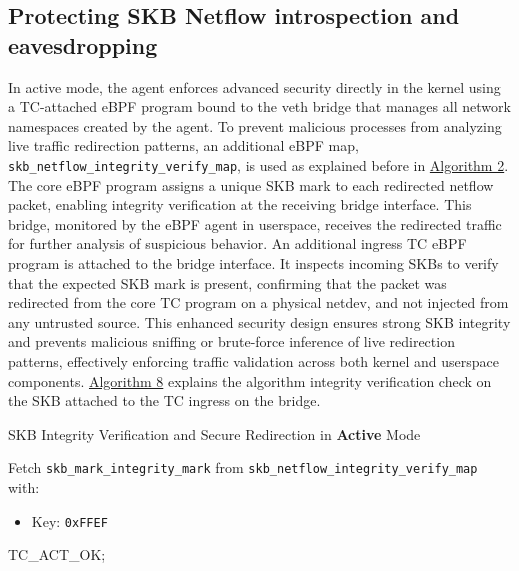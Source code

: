 \documentclass [11pt, proquest] {uwthesis}[2020/02/24]
\begin{document}
\subsection{Protecting SKB Netflow introspection and eavesdropping}
In active mode, the agent enforces advanced security directly in the kernel using a TC-attached eBPF program bound to the veth bridge that manages all network namespaces created by the agent. To prevent malicious processes from analyzing live traffic redirection patterns, an additional eBPF map, \texttt{skb\_netflow\_integrity\_verify\_map}, is used as explained before in \hyperref[sec:alg2]{Algorithm 2}. The core eBPF program assigns a unique SKB mark to each redirected netflow packet, enabling integrity verification at the receiving bridge interface. This bridge, monitored by the eBPF agent in userspace, receives the redirected traffic for further analysis of suspicious behavior.
An additional ingress TC eBPF program is attached to the bridge interface. It inspects incoming SKBs to verify that the expected SKB mark is present, confirming that the packet was redirected from the core TC program on a physical netdev, and not injected from any untrusted source. This enhanced security design ensures strong SKB integrity and prevents malicious sniffing or brute-force inference of live redirection patterns, effectively enforcing traffic validation across both kernel and userspace components. \hyperref[sec:alg8]{Algorithm 8} explains the algorithm integrity verification check on the SKB attached to the TC ingress on the bridge.

\begin{algorithm}[H]
\label{sec:alg8}
\caption{SKB Integrity Verification and Secure Redirection in \textbf{Active} Mode}
\label{sec:alg_active_mode_integrity}

\small
{}


Fetch \texttt{skb\_mark\_integrity\_mark} from \texttt{skb\_netflow\_integrity\_verify\_map} with:
\begin{itemize}[nosep]
    \item Key: \texttt{0xFFEF} 
\end{itemize}


\Return TC\_ACT\_OK;\
\end{algorithm}
\end{document}
